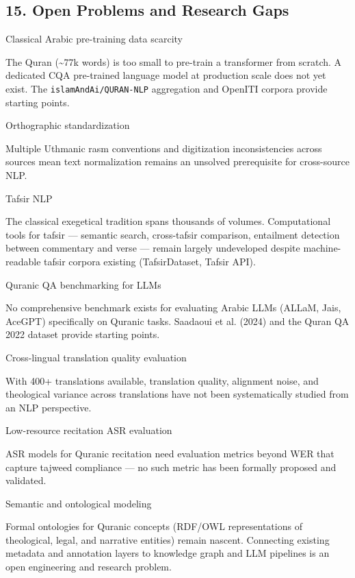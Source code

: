 \documentclass[12pt,a4paper]{article}
\begin{document}
\subsection{15. Open Problems and Research
Gaps}\label{open-problems-and-research-gaps}

Classical Arabic pre-training data scarcity

The Quran (\textasciitilde77k words) is too small to pre-train a
transformer from scratch. A dedicated CQA pre-trained language model at
production scale does not yet exist. The \texttt{islamAndAi/QURAN-NLP}
aggregation and OpenITI corpora provide starting points.

Orthographic standardization

Multiple Uthmanic rasm conventions and digitization inconsistencies
across sources mean text normalization remains an unsolved prerequisite
for cross-source NLP.

Tafsir NLP

The classical exegetical tradition spans thousands of volumes.
Computational tools for tafsir --- semantic search, cross-tafsir
comparison, entailment detection between commentary and verse --- remain
largely undeveloped despite machine-readable tafsir corpora existing
(TafsirDataset, Tafsir API).

Quranic QA benchmarking for LLMs

No comprehensive benchmark exists for evaluating Arabic LLMs (ALLaM,
Jais, AceGPT) specifically on Quranic tasks. Saadaoui et al. (2024) and
the Qur\textquotesingle an QA 2022 dataset provide starting points.

Cross-lingual translation quality evaluation

With 400+ translations available, translation quality, alignment noise,
and theological variance across translations have not been
systematically studied from an NLP perspective.

Low-resource recitation ASR evaluation

ASR models for Quranic recitation need evaluation metrics beyond WER
that capture tajweed compliance --- no such metric has been formally
proposed and validated.

Semantic and ontological modeling

Formal ontologies for Quranic concepts (RDF/OWL representations of
theological, legal, and narrative entities) remain nascent. Connecting
existing metadata and annotation layers to knowledge graph and LLM
pipelines is an open engineering and research problem.
\end{document}
